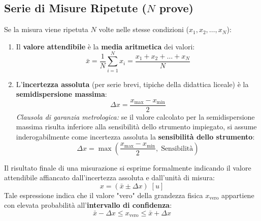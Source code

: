 \documentclass[11pt,a4paper,oneside]{report}
\begin{document}
\subsection{Serie di Misure Ripetute ($N$ prove)}
Se la misura viene ripetuta $N$ volte nelle stesse condizioni ($x_1, x_2, \dots, x_N$):
\begin{enumerate}
  \item Il \textbf{valore attendibile} è la \textbf{media aritmetica} dei valori:
  \[
  \bar{x} = \frac{1}{N} \sum_{i=1}^N x_i = \frac{x_1 + x_2 + \dots + x_N}{N}
  \]
  \item L'\textbf{incertezza assoluta} (per serie brevi, tipiche della didattica liceale) è la \textbf{semidispersione massima}:
  \[
  \Delta x = \frac{x_{\max} - x_{\min}}{2}
  \]
  \textit{Clausola di garanzia metrologica:} se il valore calcolato per la semidispersione massima risulta inferiore alla sensibilità dello strumento impiegato, si assume inderogabilmente come incertezza assoluta la \textbf{sensibilità dello strumento}:
  \[
  \Delta x = \max\left(\frac{x_{\max} - x_{\min}}{2}, \; \text{Sensibilità}\right)
  \]
\end{enumerate}

\begin{definizione}
Il risultato finale di una misurazione si esprime formalmente indicando il valore attendibile affiancato dall'incertezza assoluta e dall'unità di misura:
\[
x = (\bar{x} \pm \Delta x)\;[u]
\]
Tale espressione indica che il valore "vero" della grandezza fisica $x_{\text{vero}}$ appartiene con elevata probabilità all'\textbf{intervallo di confidenza}:
\[
\bar{x} - \Delta x \le x_{\text{vero}} \le \bar{x} + \Delta x
\]
\end{definizione}
\end{document}
